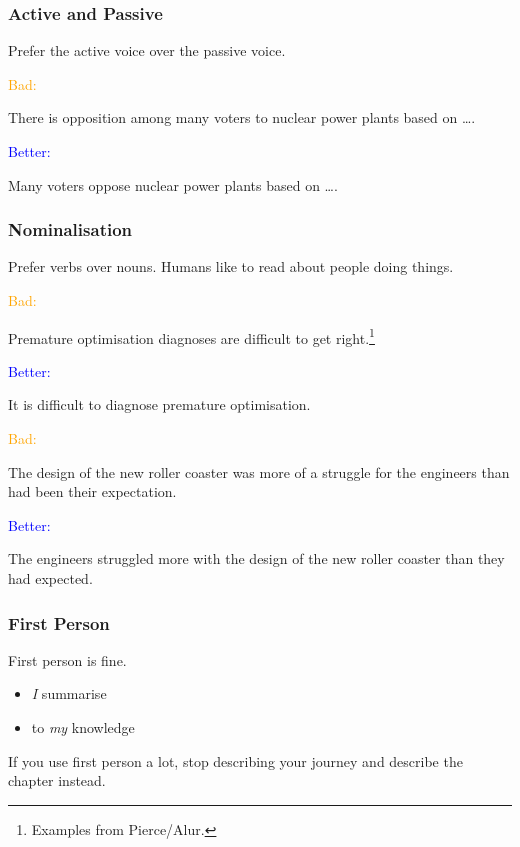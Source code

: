 \documentclass[xetex]{beamer}
\newcommand{\bad}[1]{\textcolor{orange}{#1}}
\newcommand{\good}[1]{\textcolor{blue}{#1}}
\begin{document}
\begin{frame}
  \frametitle{Active and Passive}

  Prefer the active voice over the passive voice.

  \medskip
  \pause

  \bad{Bad:}

  There is opposition among many voters to nuclear power plants based on \dots.

  \medskip
  \pause

  \good{Better:}

  Many voters oppose nuclear power plants based on \dots.
\end{frame}

\begin{frame}
  \frametitle{Nominalisation}

  Prefer verbs over nouns.
  Humans like to read about people doing things.

  \pause
  \medskip

  \bad{Bad:}

  Premature optimisation diagnoses are difficult to get right.\footnote{Examples from Pierce/Alur.}

  \medskip
  \pause

  \good{Better:}

  It is difficult to diagnose premature optimisation.

  \pause
  \medskip

  \bad{Bad:}

  The design of the new roller coaster was more of a struggle for the engineers than had been their expectation.

  \medskip
  \pause

  \good{Better:}

  The engineers struggled more with the design of the new roller coaster than they had expected.
\end{frame}

\begin{frame}
  \frametitle{First Person}

  First person is fine.
  \begin{itemize}
    \item \emph{I} summarise
    \item to \emph{my} knowledge
  \end{itemize}

  \medskip
  \pause

  If you use first person a lot, stop describing your journey and describe the chapter instead.
\end{frame}
\end{document}
